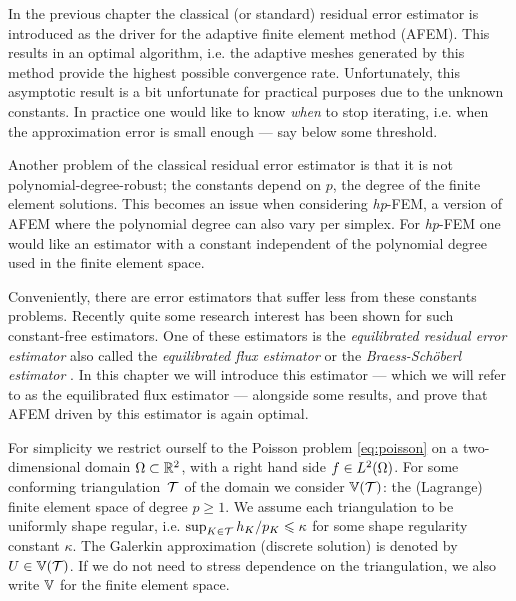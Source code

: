 \documentclass[thesis.tex]{subfiles}
\begin{document}
In the previous chapter the classical (or standard) residual error estimator is introduced as the driver for the
adaptive finite element method (AFEM). This results in an optimal algorithm, i.e. the adaptive meshes
generated by this method provide the highest possible convergence rate. Unfortunately, this asymptotic result
is a bit unfortunate for practical purposes due to the unknown constants. In practice
one would like to know \emph{when} to stop iterating, i.e. when the approximation error is small enough --- say
below some threshold. 

Another problem of the classical residual error estimator is that it is not polynomial-degree-robust; 
the constants depend on $p$, the degree of the finite element solutions. This becomes an issue
when considering \emph{hp}-FEM, a version of AFEM where the polynomial degree can also vary
per simplex. For \emph{hp}-FEM one would like an estimator with a constant independent of the polynomial degree
used in the finite element space.

Conveniently, there are error estimators that suffer less from these constants problems. Recently quite
some research interest has been shown for such constant-free estimators. One of these estimators is the
\emph{equilibrated residual error estimator} also called the \emph{equilibrated flux estimator} or the \emph{Braess-Sch\"oberl estimator}
\cite{braessequil, braessequilrobust,ernequil}.
In this chapter we will introduce this estimator --- which we will refer to as the equilibrated flux estimator --- alongside some results, and prove that AFEM driven 
by this estimator is again optimal. 

For simplicity we restrict ourself to the Poisson problem \eqref{eq:poisson} on a two-dimensional domain $\Omega \subset \mathbb{R}^2$,
with a right hand side $f \in L^2(\Omega)$. For some conforming triangulation~$\mathcal{T}$ of the domain we consider $\mathbb{V}(\mathcal{T})$: the (Lagrange) finite
element space of degree $p\geq 1$. We assume each triangulation to be uniformly shape regular, i.e. $\sup_{K \in \mathcal{T}} h_K/p_K \leqslant \kappa$ for
some shape regularity constant $\kappa$.
The Galerkin approximation (discrete solution) is denoted by $U \in \mathbb{V}(\mathcal{T})$.
If we do not need to stress dependence on the triangulation, we also write $\mathbb{V}$ for the finite element space.
\end{document}
